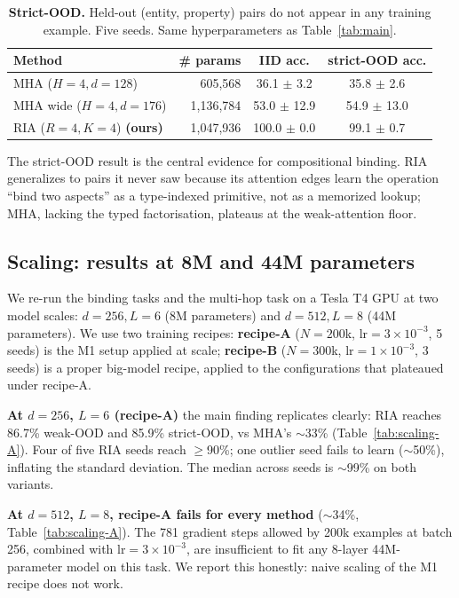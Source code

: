 \documentclass{article}
\begin{document}
\begin{table}[h]
\centering
\caption{\textbf{Strict-OOD.} Held-out (entity, property) pairs do
not appear in any training example. Five seeds. Same hyperparameters
as Table~\ref{tab:main}.}
\label{tab:strict}
\begin{tabular}{lrcc}
\toprule
Method & \# params & IID acc. & strict-OOD acc. \\
\midrule
MHA ($H{=}4, d{=}128$)  & 605,568  & 36.1 $\pm$ 3.2  & 35.8 $\pm$ 2.6 \\
MHA wide ($H{=}4, d{=}176$)  & 1,136,784  & 53.0 $\pm$ 12.9  & 54.9 $\pm$ 13.0 \\
RIA ($R{=}4, K{=}4$) \textbf{(ours)}  & 1,047,936  & 100.0 $\pm$ 0.0  & 99.1 $\pm$ 0.7 \\
\bottomrule
\end{tabular}
\end{table}

The strict-OOD result is the central evidence for compositional
binding. RIA generalizes to pairs it never saw because its
attention edges learn the operation ``bind two aspects'' as a
type-indexed primitive, not as a memorized lookup; MHA, lacking the
typed factorisation, plateaus at the weak-attention floor.



\subsection{Scaling: results at 8M and 44M parameters}
\label{sec:scaling}

We re-run the binding tasks and the multi-hop task on a Tesla T4
GPU at two model scales: $d{=}256, L{=}6$ (8M parameters) and
$d{=}512, L{=}8$ (44M parameters). We use two training recipes:
\textbf{recipe-A} ($N{=}200$k, $\mathrm{lr}{=}3\!\times\!10^{-3}$,
5 seeds) is the M1 setup applied at scale; \textbf{recipe-B}
($N{=}300$k, $\mathrm{lr}{=}1\!\times\!10^{-3}$, 3 seeds) is a
proper big-model recipe, applied to the configurations that
plateaued under recipe-A.

\textbf{At $d{=}256$, $L{=}6$ (recipe-A)} the main finding replicates
clearly: RIA reaches 86.7\% weak-OOD and 85.9\% strict-OOD, vs
MHA's $\sim$33\% (Table~\ref{tab:scaling-A}). Four of five RIA
seeds reach $\ge$90\%; one outlier seed fails to learn ($\sim$50\%),
inflating the standard deviation. The median across seeds is
$\sim$99\% on both variants.

\textbf{At $d{=}512$, $L{=}8$, recipe-A fails for every method}
($\sim$34\%, Table~\ref{tab:scaling-A}). The 781 gradient steps
allowed by 200k examples at batch 256, combined with
$\mathrm{lr}{=}3\!\times\!10^{-3}$, are insufficient to fit any
8-layer 44M-parameter model on this task. We report this honestly:
naive scaling of the M1 recipe does not work.
\end{document}
